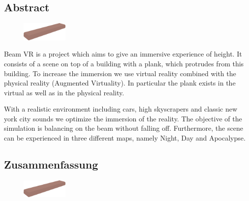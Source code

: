 \begin{spacing}{1}

    \chapter*{Abstract}

\end{spacing}

\begin{figure}

    \begin{center}

        \includegraphics[width=0.2\textwidth]{pics/abstract_picture_1}

    \end{center}

\end{figure}

Beam VR is a project which aims to give an immersive experience of height.
It consists of a scene on top of a building with a plank, which protrudes from this building.
To increase the immersion we use virtual reality combined with the physical reality (Augmented Virtuality).
In particular the plank exists in the virtual as well as in the physical reality.

With a realistic environment including cars, high skyscrapers and classic new york city sounds we optimize the immersion of the reality.
The objective of the simulation is balancing on the beam without falling off.
Furthermore, the scene can be experienced in three different maps, namely Night, Day and Apocalypse.

\newpage

\begin{spacing}{1}

    \chapter*{Zusammenfassung}

\end{spacing}

\begin{figure}

    \begin{center}

        \includegraphics[width=0.2\textwidth]{pics/abstract_picture_1}

    \end{center}

\end{figure}

